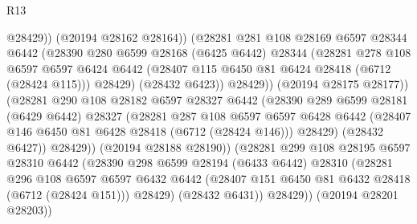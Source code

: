 \begin{lexlean}{R13}
\begin{coremodule}
                              @28429))
                          (@20194 @28162 @28164))
                        (@28281
                          @281
                          @108
                          @28169
                          @6597
                          @28344
                          @6442
                          (@28390
                            @280
                            @6599
                            @28168
                            (@6425 @6442)
                            @28344
                            (@28281
                              @278
                              @108
                              @6597
                              @6597
                              @6424
                              @6442
                              (@28407 @115 @6450 @81 @6424 @28418 (@6712 (@28424 @115)))
                              @28429)
                            (@28432 @6423))
                          @28429))
                      (@20194 @28175 @28177))
                    (@28281
                      @290
                      @108
                      @28182
                      @6597
                      @28327
                      @6442
                      (@28390
                        @289
                        @6599
                        @28181
                        (@6429 @6442)
                        @28327
                        (@28281
                          @287
                          @108
                          @6597
                          @6597
                          @6428
                          @6442
                          (@28407 @146 @6450 @81 @6428 @28418 (@6712 (@28424 @146)))
                          @28429)
                        (@28432 @6427))
                      @28429))
                  (@20194 @28188 @28190))
                (@28281
                  @299
                  @108
                  @28195
                  @6597
                  @28310
                  @6442
                  (@28390
                    @298
                    @6599
                    @28194
                    (@6433 @6442)
                    @28310
                    (@28281
                      @296
                      @108
                      @6597
                      @6597
                      @6432
                      @6442
                      (@28407 @151 @6450 @81 @6432 @28418 (@6712 (@28424 @151)))
                      @28429)
                    (@28432 @6431))
                  @28429))
              (@20194 @28201 @28203))

\end{coremodule}
\end{lexlean}
